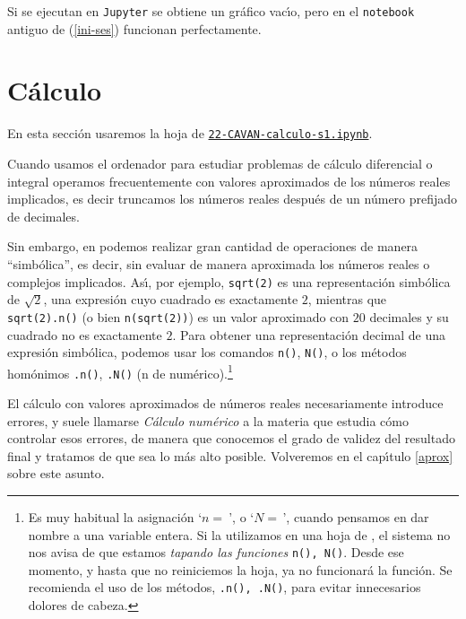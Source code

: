 Si se ejecutan en {\tt Jupyter} se obtiene un gr\'afico vac\'{\i}o, pero en el {\tt notebook} antiguo de {\sage} (\ref{ini-ses}) funcionan perfectamente. 

\section{C\'alculo}


En esta secci\'on usaremos la hoja de {\sage} 
\href{http://localhost:8888/notebooks/CAVAN/22-CAVAN-calculo-s1.ipynb}{\tt 22-CAVAN-calculo-s1.ipynb}.

\medskip

Cuando usamos el ordenador para estudiar problemas de c\'alculo diferencial o
integral operamos frecuentemente con valores aproximados de los n\'umeros reales
implicados, es decir truncamos los n\'umeros reales despu\'es de un n\'umero
prefijado de decimales. 

Sin embargo, en {\sage} podemos realizar gran cantidad de operaciones de manera
``simb\'olica'', es decir,  sin evaluar de manera aproximada los n\'umeros
reales o complejos implicados. As\'{\i}, por ejemplo, \lstinline|sqrt(2)| es una
representaci\'on simb\'olica de $\sqrt{2}$, una expresi\'on cuyo cuadrado es
exactamente $2$,  mientras que  \lstinline|sqrt(2).n()| (o bien
\lstinline|n(sqrt(2))|) es un valor aproximado con $20$ decimales y su cuadrado
no es exactamente $2$.
\label{num}
Para obtener una
representación decimal de una expresión simbólica, podemos usar los comandos
\lstinline|n()|, \lstinline|N()|,  o los métodos homónimos \lstinline|.n()|,
\lstinline|.N()| (n de numérico).\footnote{Es muy
habitual la asignación `$n=\ $', o `$N=\,$', cuando pensamos en dar nombre a una
variable
entera. Si la utilizamos en una hoja de {\sage}, el sistema no nos avisa de que
estamos
\emph{tapando las funciones} \lstinline|n(), N()|. Desde ese momento, y hasta
que no
reiniciemos la hoja, ya no funcionará la función. Se recomienda el uso de los
métodos,
\lstinline|.n(), .N()|, para evitar innecesarios dolores de cabeza.}


El c\'alculo con valores aproximados de n\'umeros reales necesariamente
introduce errores, y suele llamarse {\itshape C\'alculo num\'erico} a la materia
que estudia c\'omo controlar esos errores, de manera que conocemos el grado de
validez del resultado final y tratamos de que sea lo m\'as alto posible. 
Volveremos en el cap\'{\i}tulo \ref{aprox} sobre este asunto. 

